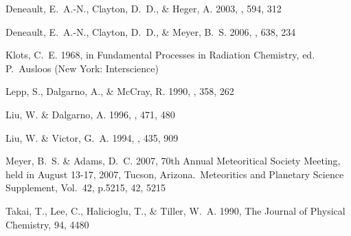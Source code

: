 \documentclass[manuscript]{aastex}
\begin{document}
\begin{CJK*}{UTF8}{gbsn}
\begin{thebibliography}{14}
{Deneault}, E.~A.-N., {Clayton}, D.~D., \& {Heger}, A. 2003, \apj, 594, 312

{Deneault}, E.~A.-N., {Clayton}, D.~D., \& {Meyer}, B.~S. 2006, \apj, 638, 234

{Klots}, C.~E. 1968, in Fundamental Processes in Radiation Chemistry, ed.
  P.~{Ausloos} (New York: Interscience)

{Lepp}, S., {Dalgarno}, A., \& {McCray}, R. 1990, \apj, 358, 262

{Liu}, W. \& {Dalgarno}, A. 1996, \apj, 471, 480

{Liu}, W. \& {Victor}, G.~A. 1994, \apj, 435, 909

{Meyer}, B.~S. \& {Adams}, D.~C. 2007, 70th Annual Meteoritical Society
  Meeting, held in August 13-17, 2007, Tucson, Arizona.~Meteoritics and
  Planetary Science Supplement, Vol.~42, p.5215, 42, 5215

Takai, T., Lee, C., Halicioglu, T., \& Tiller, W.~A. 1990, The Journal of
  Physical Chemistry, 94, 4480

\end{thebibliography}

\end{CJK*}
\end{document}
